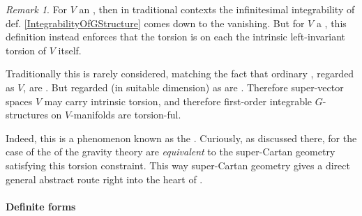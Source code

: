 \documentclass[12pt,titlepage]{article}
\theoremstyle{plain}
\theoremstyle{definition}
\theoremstyle{remark}
\newtheorem{remark}{Remark}
\begin{document}
\begin{remark}
\label{TorsionConstraints}\hypertarget{TorsionConstraints}{}
For $V$ an , then in traditional contexts the infinitesimal integrability of def. \ref{IntegrabilityOfGStructure} comes down to the  vanishing. But for $V$ a , this definition instead enforces that the torsion is on each  the intrinsic left-invariant torsion of $V$ itself.

Traditionally this is rarely considered, matching the fact that ordinary , regarded as  $V$, are . But  regarded (in suitable dimension) as  are . Therefore super-vector spaces $V$ may carry intrinsic torsion, and therefore first-order integrable $G$-structures on $V$-manifolds are torsion-ful.

Indeed, this is a phenomenon known as the . Curiously, as discussed there, for the case of  the  of the gravity theory are \emph{equivalent} to the super-Cartan geometry satisfying this torsion constraint. This way super-Cartan geometry gives a direct general abstract route right into the heart of .

\end{remark}
\hypertarget{definite_forms}{}\paragraph*{{Definite forms}}\label{definite_forms}
\end{document}
